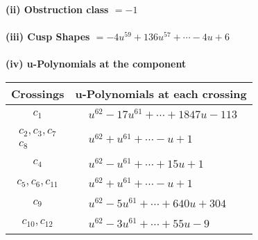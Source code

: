 \documentclass[1p]{elsarticle_modified}
\theoremstyle{definition}
\begin{document}
\flushleft \textbf{(ii) Obstruction class $= -1$}\\~\\
\flushleft \textbf{(iii) Cusp Shapes $= -4 u^{59}+136 u^{57}+\cdots-4 u+6$}\\~\\
\newpage\renewcommand{\arraystretch}{1}
\flushleft \textbf{(iv) u-Polynomials at the component}\newline \\
\begin{tabular}{m{50pt}|m{274pt}}
Crossings & \hspace{64pt}u-Polynomials at each crossing \\
\hline $$\begin{aligned}c_{1}\end{aligned}$$&$\begin{aligned}
&u^{62}-17 u^{61}+\cdots+1847 u-113
\end{aligned}$\\
\hline $$\begin{aligned}c_{2},c_{3},c_{7}\\c_{8}\end{aligned}$$&$\begin{aligned}
&u^{62}+u^{61}+\cdots- u+1
\end{aligned}$\\
\hline $$\begin{aligned}c_{4}\end{aligned}$$&$\begin{aligned}
&u^{62}- u^{61}+\cdots+15 u+1
\end{aligned}$\\
\hline $$\begin{aligned}c_{5},c_{6},c_{11}\end{aligned}$$&$\begin{aligned}
&u^{62}+u^{61}+\cdots- u+1
\end{aligned}$\\
\hline $$\begin{aligned}c_{9}\end{aligned}$$&$\begin{aligned}
&u^{62}-5 u^{61}+\cdots+640 u+304
\end{aligned}$\\
\hline $$\begin{aligned}c_{10},c_{12}\end{aligned}$$&$\begin{aligned}
&u^{62}-3 u^{61}+\cdots+55 u-9
\end{aligned}$\\
\hline
\end{tabular}\\~\\
\end{document}
